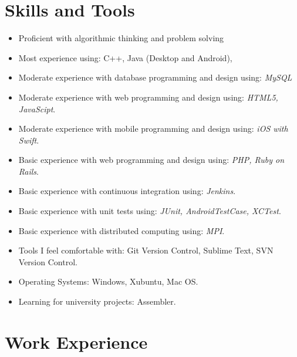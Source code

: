 \documentclass[a4paper,10pt]{article} %
\begin{document}

\section{Skills and Tools}
\begin{itemize}
 \item Proficient with algorithmic thinking and problem solving
 \item Most experience using: C++, Java (Desktop and Android),
 \item Moderate experience with database programming and design using: {\sl MySQL}
 \item Moderate experience with web programming and design using: {\sl HTML5, JavaScipt}.
 \item Moderate experience with mobile programming and design using: {\sl iOS with Swift}.
 \item Basic experience with web programming and design using: {\sl PHP, Ruby on Rails}.
 \item Basic experience with continuous integration using: {\sl Jenkins}.
 \item Basic experience with unit tests using: {\sl JUnit, AndroidTestCase, XCTest}.
 \item Basic experience with distributed computing using: {\sl MPI}.
 \item Tools I feel comfortable with: Git Version Control, Sublime Text, SVN Version Control.
 \item Operating Systems: Windows, Xubuntu, Mac OS.
 \item Learning for university projects: Assembler.
\end{itemize}


\section{Work Experience}
\end{document}
